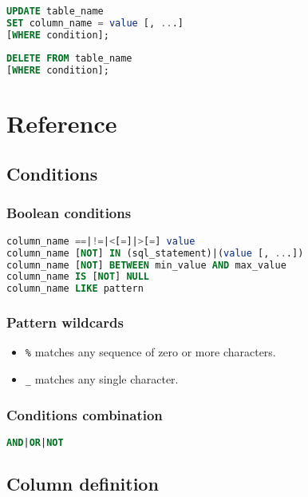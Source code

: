 \documentclass{hibiscus}
\begin{document}
\begin{lstlisting}[language=SQL]
UPDATE table_name
SET column_name = value [, ...]
[WHERE condition];
\end{lstlisting}

\begin{lstlisting}[language=SQL]
DELETE FROM table_name
[WHERE condition];
\end{lstlisting}

\section{Reference}

\subsection{Conditions}

\subsubsection{Boolean conditions}

\begin{lstlisting}[language=SQL]
column_name ==|!=|<[=]|>[=] value
column_name [NOT] IN (sql_statement)|(value [, ...])
column_name [NOT] BETWEEN min_value AND max_value
column_name IS [NOT] NULL
column_name LIKE pattern
\end{lstlisting}

\subsubsection{Pattern wildcards}

\begin{itemize}
    \item \lstinline+%+ matches any sequence of zero or more characters.
    \item \lstinline+_+ matches any single character.
\end{itemize}

\subsubsection{Conditions combination}

\begin{lstlisting}[language=SQL]
AND|OR|NOT
\end{lstlisting}

\subsection{Column definition}
\end{document}
